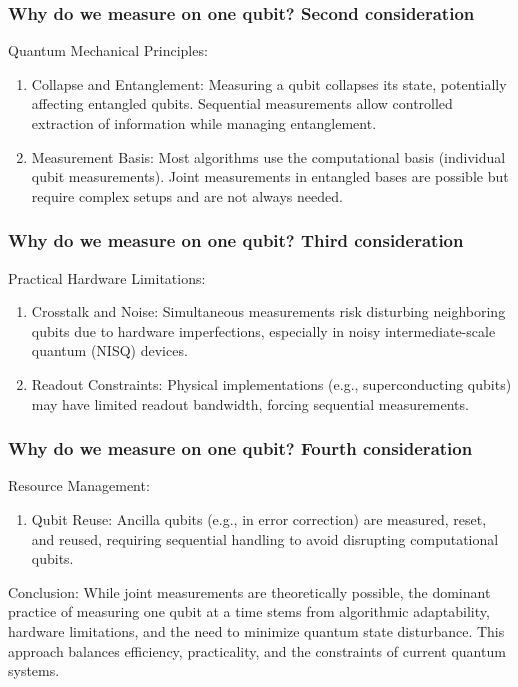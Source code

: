 \documentclass{beamer}
\begin{document}
\begin{frame}
\frametitle{Why do we measure on one qubit? Second consideration}

\begin{block}{Quantum Mechanical Principles: }
\begin{enumerate}
\item Collapse and Entanglement: Measuring a qubit collapses its state, potentially affecting entangled qubits. Sequential measurements allow controlled extraction of information while managing entanglement.

\item Measurement Basis: Most algorithms use the computational basis (individual qubit measurements). Joint measurements in entangled bases are possible but require complex setups and are not always needed.
\end{enumerate}

\noindent
\end{block}
\end{frame}

\begin{frame}
\frametitle{Why do we measure on one qubit? Third consideration}

\begin{block}{Practical Hardware Limitations: }
\begin{enumerate}
\item Crosstalk and Noise: Simultaneous measurements risk disturbing neighboring qubits due to hardware imperfections, especially in noisy intermediate-scale quantum (NISQ) devices.

\item Readout Constraints: Physical implementations (e.g., superconducting qubits) may have limited readout bandwidth, forcing sequential measurements.
\end{enumerate}

\noindent
\end{block}
\end{frame}

\begin{frame}
\frametitle{Why do we measure on one qubit? Fourth consideration}

\begin{block}{Resource Management: }
\begin{enumerate}
\item Qubit Reuse: Ancilla qubits (e.g., in error correction) are measured, reset, and reused, requiring sequential handling to avoid disrupting computational qubits.
\end{enumerate}

\noindent
\end{block}
\begin{block}{Conclusion: }
While joint measurements are theoretically possible, the dominant practice of measuring one qubit at a time stems from algorithmic adaptability, hardware limitations, and the need to minimize quantum state disturbance. This approach balances efficiency, practicality, and the constraints of current quantum systems.
\end{block}
\end{frame}
\end{document}
